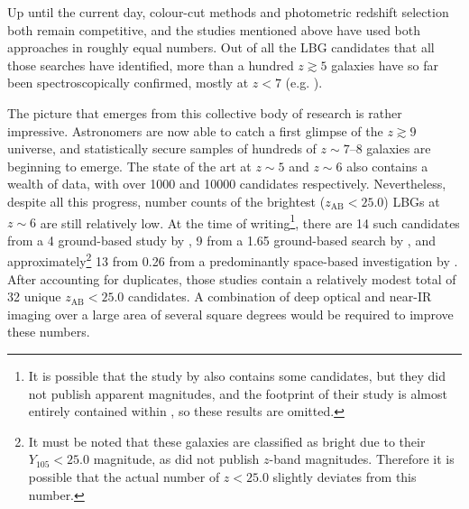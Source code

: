 Up until the current day, colour-cut methods and photometric redshift selection both remain competitive, and the studies mentioned above have used both approaches in roughly equal numbers. Out of all  the LBG candidates that all those searches have identified, more than a hundred $z\gtrsim5$ galaxies have so far been spectroscopically confirmed, mostly at $z<7$  (e.g. \citealt{2005ApJ...626..666M,2009ApJ...695.1163V,2010MNRAS.408.1628S,2011ApJ...743...65J,2012MNRAS.422.1425C,2014ApJ...793..113P,2018MNRAS.479...43K}). \par 

The picture that emerges from this collective body of research is rather impressive. Astronomers are now able to catch a first glimpse of the $z\gtrsim9$ universe, and statistically secure samples of hundreds of $z\sim7\text{--}8$ galaxies are beginning to emerge. The state of the art at $z\sim5$ and $z\sim6$ also contains a wealth of data, with over 1000 and \num{10000} candidates respectively. Nevertheless, despite all this progress, number counts of the brightest ($z_{\mathrm{AB}}<25.0$) LBGs at $z\sim6$ are still relatively low. At the time of writing\footnote{It is possible that the study by \cite{2015ApJ...810...71F} also contains some candidates, but they did not publish apparent magnitudes, and the footprint of their study is almost entirely contained within \cite{2015ApJ...803...34B}, so these results are omitted.}, there are 14 such candidates from a \SI{4}{\sqdeg} ground-based study by \cite{2013AJ....145....4W},  9 from a \SI{1.65}{\sqdeg}  ground-based search by \cite{2015MNRAS.452.1817B}, and approximately\footnote{It must be noted that these galaxies are classified as bright due to their $Y_{105}<25.0$ magnitude, as \cite{2015ApJ...803...34B} did not publish $z$-band magnitudes. Therefore it is possible that the actual number of $z<25.0$ slightly deviates from this number.} 13 from \SI{0.26}{\sqdeg} from a predominantly space-based investigation by \cite{2015ApJ...803...34B}. After accounting for duplicates, those studies contain a relatively modest total of 32 unique $z_{\mathrm{AB}}<25.0$ candidates. A combination of deep optical and near-IR imaging over a large area of several square degrees would be required to improve these numbers. \par





